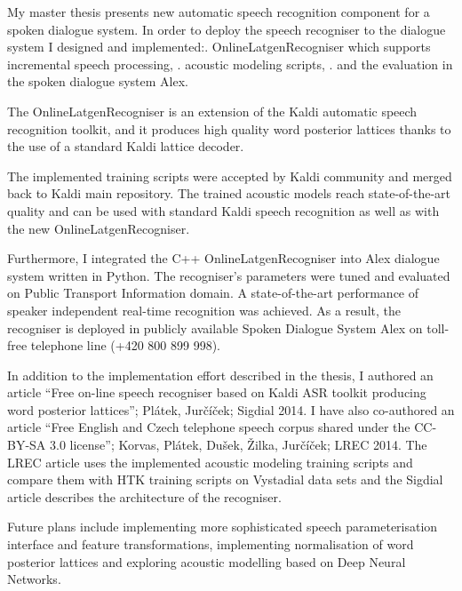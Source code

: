 My master thesis presents new automatic speech recognition component for a spoken dialogue system.
In order to deploy the speech recogniser to the dialogue system I designed and implemented:\hfil\break\hfil{}. OnlineLatgenRecogniser which supports incremental speech processing, \hfil{}. acoustic modeling scripts, \hfil{}. and the evaluation in the spoken dialogue system Alex.\hfil\break

The OnlineLatgenRecogniser is an extension of the Kaldi automatic speech recognition toolkit, and
it produces high quality word posterior lattices thanks to the use of a standard Kaldi lattice decoder.

The implemented training scripts were accepted by Kaldi community and merged back to Kaldi main repository. 
The trained acoustic models reach state-of-the-art quality and can be used with standard Kaldi speech recognition as well as with the new OnlineLatgenRecogniser. 

Furthermore, I integrated the C++ OnlineLatgenRecogniser into Alex dialogue system written in Python. 
The recogniser's parameters were tuned and evaluated on Public Transport Information domain. 
A state-of-the-art performance of speaker independent real-time recognition was achieved. 
As a result, the recogniser is deployed in publicly available Spoken Dialogue System Alex on toll-free telephone line (+420 800 899 998).

In addition to the implementation effort described in the thesis, I authored an article ``Free on-line speech recogniser based on Kaldi ASR toolkit producing word posterior lattices''; Pl\'{a}tek, Jur\v{c}\'{i}\v{c}ek; Sigdial 2014. I have also co-authored an article ``Free English and Czech telephone speech corpus shared under the CC-BY-SA 3.0 license''; Korvas, Pl\'{a}tek, Du\v{s}ek, \v{Z}ilka, Jur\v{c}\'{i}\v{c}ek; LREC 2014. The LREC article uses the implemented acoustic modeling training scripts and compare them with HTK training scripts on Vystadial data sets and the Sigdial article describes the architecture of the recogniser. 

Future plans include implementing more sophisticated speech parameterisation interface and feature transformations, implementing normalisation of word posterior lattices and exploring acoustic modelling based on Deep Neural Networks.
